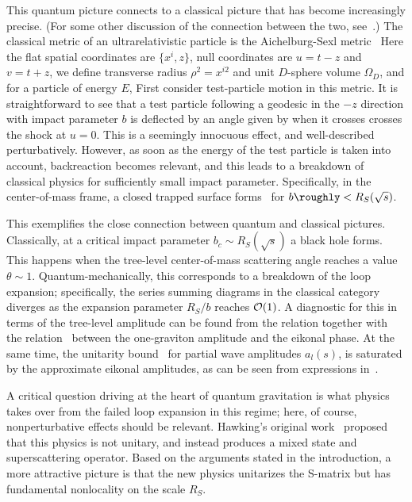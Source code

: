 This quantum picture connects to a classical picture that has become increasingly precise.  (For some other discussion of the connection between the two, see~.)  The classical metric of an ultrarelativistic particle is the Aichelburg-Sexl metric~
%
\eqn{}
%
Here the flat spatial coordinates are $\{x^i, z\}$, null coordinates are $u=t-z$ and $v=t+z$, we define transverse radius $\rho^2=x^{i2}$ and unit $D$-sphere volume $\Omega_D$, and for a particle of energy $E$,
%
\eqn{}
%
First consider test-particle motion in this metric.  It is straightforward to see that a test particle following a geodesic in the $-z$ direction with impact parameter $b$ is deflected by an angle given by
%
\eqn{}
%
when it crosses crosses the shock at $u=0$.  This is a seemingly innocuous effect, and well-described perturbatively.  However, as soon as the energy of the test particle is taken into account, backreaction becomes relevant, and this leads to a breakdown of classical physics for sufficiently small impact parameter.  Specifically, in the center-of-mass frame, a closed trapped surface forms~ for $b\roughly<R_S(\sqrt s)$.  

This exemplifies the close connection between quantum and classical pictures.  Classically, at a critical impact parameter $b_c\sim R_S(\sqrt s)$ a black hole forms.  This happens when the tree-level center-of-mass scattering angle reaches a value $\theta\sim 1$.  Quantum-mechanically, this corresponds to a breakdown of the loop expansion; specifically, the series summing diagrams in the classical category diverges as the expansion parameter $R_S/b$ reaches ${\cal O}(1)$.  A diagnostic for this in terms of the tree-level amplitude can be found from the relation
%
\eqn{}
%
together with the relation \eiktree\ between the one-graviton amplitude and the eikonal phase.
At the same time, the unitarity bound~ for partial wave amplitudes $a_l(s)$,
%
\eqn{}
%
is saturated by the approximate eikonal amplitudes, as can be seen from expressions in~.

A critical question driving at the heart of quantum gravitation is what physics takes over from the failed loop expansion in this regime; here, of course, nonperturbative effects should be relevant.  Hawking's original work~ proposed that this physics is not unitary, and instead produces a mixed state and superscattering operator.  Based on the arguments stated in the introduction, a more attractive picture is that the new physics unitarizes the S-matrix but has fundamental nonlocality on the scale $R_S$.  

